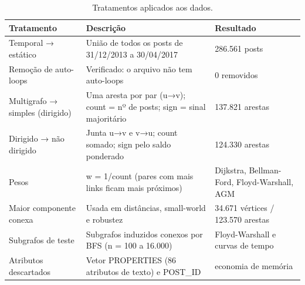 \begin{table}[htbp]
\centering
\small
\caption{Tratamentos aplicados aos dados.}
\label{tab:02_tratamentos}
\begin{tabular}{lll}
\toprule
Tratamento & Descrição & Resultado \\
\midrule
Temporal → estático & União de todos os posts de 31/12/2013 a 30/04/2017 & 286.561 posts \\
Remoção de auto-loops & Verificado: o arquivo não tem auto-loops & 0 removidos \\
Multigrafo → simples (dirigido) & Uma aresta por par (u→v); count = nº de posts; sign = sinal majoritário & 137.821 arestas \\
Dirigido → não dirigido & Junta u→v e v→u; count somado; sign pelo saldo ponderado & 124.330 arestas \\
Pesos & w = 1/count (pares com mais links ficam mais próximos) & Dijkstra, Bellman-Ford, Floyd-Warshall, AGM \\
Maior componente conexa & Usada em distâncias, small-world e robustez & 34.671 vértices / 123.570 arestas \\
Subgrafos de teste & Subgrafos induzidos conexos por BFS (n = 100 a 16.000) & Floyd-Warshall e curvas de tempo \\
Atributos descartados & Vetor PROPERTIES (86 atributos de texto) e POST\_ID & economia de memória \\
\bottomrule
\end{tabular}
\end{table}

